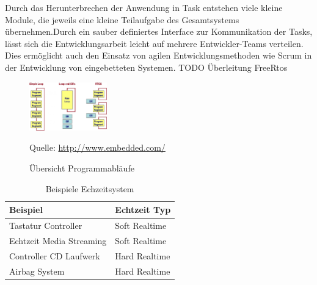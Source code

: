 \documentclass[ngerman]{seminarvorlage}
\newcommand*{\quelle}{%
  \footnotesize Quelle: 
}
\begin{document}
Durch das Herunterbrechen der Anwendung in Task entstehen viele kleine Module, die jeweils eine kleine Teilaufgabe des Gesamtsystems übernehmen.Durch ein sauber definiertes Interface zur Kommunikation der Tasks, lässt sich die Entwicklungsarbeit leicht auf mehrere Entwickler-Teams verteilen. Dies ermöglicht auch den Einsatz von agilen Entwicklungsmethoden wie Scrum in der Entwicklung von eingebetteten Systemen.  
\newline
TODO Überleitung FreeRtos
\newline  
\begin{figure}
	\centering
		\includegraphics[width=0.3\textwidth]{Pictures/EmbeddedCom/cwrtos2f5c.jpg}
	\caption{Übersicht Programmabläufe}
	\quelle\url{http://www.embedded.com/}
	\label{fig:Programmablauf}
\end{figure}

\begin{table}
	\centering
		\begin{tabular}{|l|l|}
		\hline
			   Beispiel & Echtzeit Typ \\
				\hline
  Tastatur Controller & Soft Realtime \\
	\hline
  Echtzeit Media Streaming  & Soft Realtime \\
	\hline
	Controller CD Laufwerk  & Hard Realtime \\
	\hline
	Airbag System  & Hard Realtime\\
	\hline
		\end{tabular}
	\caption{Beispiele Echzeitsystem}
	\label{tab:BeispieleEchzeitsystem}
\end{table}

\end{document}
